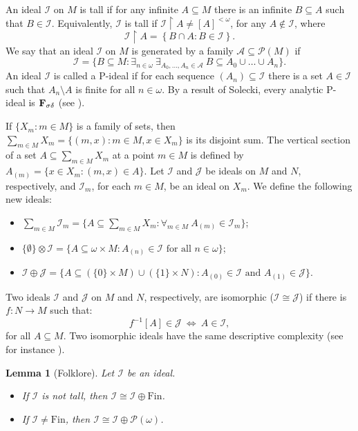 \documentclass[10pt,a4paper]{amsart}
\newcommand{\I}{\mathcal{I}}
\newcommand{\J}{\mathcal{J}}
\newcommand{\Fin}{\mathrm{Fin}}
\newtheorem{lemma}[theorem]{Lemma}
\begin{document}
An ideal $\I$ on $M$ is tall if for any infinite $A\subseteq M$ there is an infinite $B\subseteq A$ such that $B\in\I$. Equivalently, $\I$ is tall if $\I\restriction A\neq[A]^{<\omega}$, for any $A\notin\I$, where
\[
\I\restriction A=\left\{B\cap A:B\in\I\right\}.
\]
We say that an ideal $\I$ on $M$ is generated by a family $\mathcal{A}\subseteq\mathcal{P}(M)$ if 
\[
\I=\{B\subseteq M:\exists_{n\in\omega}\ \exists_{A_0,\ldots,A_n\in\mathcal{A}}\ B\subseteq A_0\cup\ldots\cup A_n\}.
\]
An ideal $\I$ is called a P-ideal if for each sequence $(A_n)\subseteq  \I$ there is a set $A\in\I$ such that $A_n\setminus A$ is finite for all $n\in\omega$. By a result of Solecki, every analytic P-ideal is $\bf{F_{\sigma\delta}}$ (see \cite{Solecki}).

If $\{X_m: m\in M\}$ is a family of sets, then $\sum_{m\in M}X_m=\{(m,x): m\in M,x\in X_m\}$ is its disjoint sum. The vertical section of a set $A\subseteq \sum_{m\in M}X_m$ at a point $m\in M$ is defined
by $A_{(m)} = \{x\in X_m: (m,x)\in A\}$. Let $\I$ and $\J$ be ideals on $M$ and $N$, respectively, and $\I_m$, for each $m\in M$, be an ideal on $X_m$. We define the following new ideals:
\begin{itemize}
	\item $\sum_{m\in M}\I_m=\{A\subseteq \sum_{m\in M}X_m: \forall_{m\in M}\ A_{(m)}\in\I_m\}$;
	\item $\{\emptyset\} \otimes  \I= \{A\subseteq \omega\times M: A_{(n)} \in \I\text{ for all }n\in \omega\}$;
    \item $\I\oplus\J=\{A\subseteq(\{0\}\times M)\cup(\{1\}\times N): A_{(0)}\in\I\text{ and }A_{(1)}\in\J\}$.
\end{itemize}

Two ideals $\I$ and $\J$ on $M$ and $N$, respectively, are isomorphic ($\I\cong\J$) if there is $f:N\to M$ such that:
\[
f^{-1}[A]\in\J\ \Leftrightarrow\ A\in\I,
\]
for all $A\subseteq M$. Two isomorphic ideals have the same descriptive complexity (see for instance \cite[Lemma 7.2]{Debs}). 

\begin{lemma}[Folklore]
\label{lem-isomorphisms}
Let $\I$ be an ideal.
\begin{itemize}
    \item[(a)] If $\I$ is not tall, then $\I\cong\I\oplus\Fin$.
    \item[(b)] If $\I\neq\Fin$, then $\I\cong\I\oplus\mathcal{P}(\omega)$.
\end{itemize}
\end{lemma}
\end{document}

